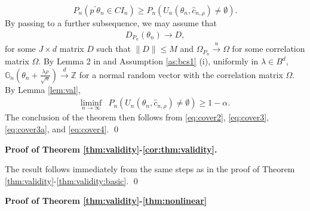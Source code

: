 \documentclass[letterpaper,11pt]{article}
\theoremstyle{myplain}
\theoremstyle{mydefinition}
\theoremstyle{myremark}
\renewcommand{\cite}{\citet}
\newcommand{\HH}{\mathbb{Z}}
\newcommand{\larhon}{\frac{\lambda \rho }{\sqrt n}}
\numberwithin{equation}{section}
\numberwithin{figure}{section}
\begin{document}
\begin{appendices}
\begin{equation}
P_{n}(p^\prime \theta_{n} \in CI_{n}) \ge P_{n}\left(U_{n}(\theta_{n},\hat{c}_{n,\rho})\neq \emptyset\right).	\label{eq:cover3a}
\end{equation}
 By passing to a further subsequence, we may assume that
\begin{align}
	D_{P_{n}}(\theta_{n})\to D, 
	\label{eq:val3_0}
\end{align}
for some $J\times d$ matrix $D$ such that $\|D\|\le M$ and $\Omega_{P_n}\stackrel{u}{\to}\Omega$ for some correlation matrix $\Omega$. By Lemma 2 in \cite{Andrews_Guggenberger2009bET} and Assumption \ref{as:bcs1} (i), uniformly in $\lambda \in B^d$, $\mathbb G_{n}(\theta_n+\larhon)\stackrel{d}{\to} \HH$ for a normal random vector with the correlation matrix $\Omega$. 
By Lemma \ref{lem:val},
\begin{align}
\liminf_{n \to \infty}&P_{n}\left(U_{n}(\theta_{n},\hat{c}_{n,\rho})\neq \emptyset\right)\ge 1-\alpha \label{eq:cover4}.
\end{align}
The conclusion of the theorem then follows from \eqref{eq:cover2}, \eqref{eq:cover3}, \eqref{eq:cover3a}, and \eqref{eq:cover4}.
\qed
\bigskip

\noindent\textbf{Proof of Theorem \ref{thm:validity}-\ref{cor:thm:validity}.}

The result follows immediately from the same steps as in the proof of Theorem \ref{thm:validity}-\ref{thm:validity:basic}.
\qed
\bigskip

\noindent\textbf{Proof of Theorem \ref{thm:validity}-\ref{thm:nonlinear}}


\end{appendices}
\end{document}
